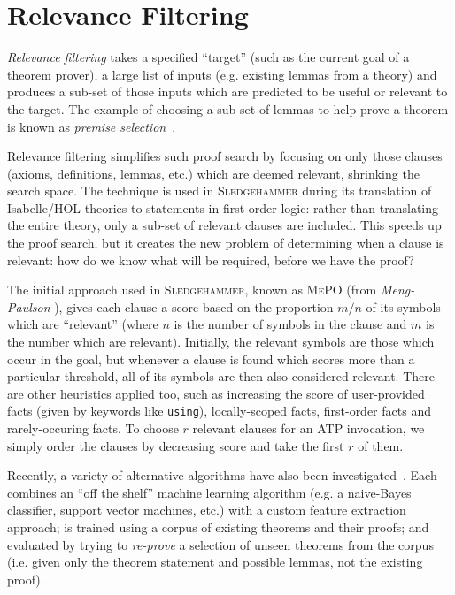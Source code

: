 \section{Relevance Filtering}
\label{sec:relevance}

\emph{Relevance filtering} takes a specified ``target'' (such as the current
goal of a theorem prover), a large list of inputs (e.g. existing lemmas from a
theory) and produces a sub-set of those inputs which are predicted to be useful
or relevant to the target. The example of choosing a sub-set of lemmas to help
prove a theorem is known as \emph{premise
  selection}~\cite{kuhlwein2012overview}.

Relevance filtering simplifies such proof search by focusing on only those
clauses (axioms, definitions, lemmas, etc.) which are deemed relevant, shrinking
the search space. The technique is used in \textsc{Sledgehammer} during its
translation of Isabelle/HOL theories to statements in first order logic: rather
than translating the entire theory, only a sub-set of relevant clauses are
included. This speeds up the proof search, but it creates the new problem of
determining when a clause is relevant: how do we know what will be required,
before we have the proof?

The initial approach used in \textsc{Sledgehammer}, known as \textsc{MePO} (from
\emph{Meng-Paulson} \cite{meng2009lightweight}), gives each clause a score based
on the proportion $m / n$ of its symbols which are ``relevant'' (where $n$ is
the number of symbols in the clause and $m$ is the number which are relevant).
Initially, the relevant symbols are those which occur in the goal, but whenever
a clause is found which scores more than a particular threshold, all of its
symbols are then also considered relevant. There are other heuristics applied
too, such as increasing the score of user-provided facts (given by keywords
like \texttt{using}), locally-scoped facts, first-order facts and
rarely-occuring facts. To choose $r$ relevant clauses for an ATP invocation, we
simply order the clauses by decreasing score and take the first $r$ of them.

Recently, a variety of alternative algorithms have also been
investigated~\cite{kuhlwein2013mash,hoder2011sine,urban2013blistr,gauthier2015premise,alama2014premise,carlson1999snow,kaliszyk2014machinelearner,kaliszyk2015femalecop}.
Each combines an ``off the shelf'' machine learning algorithm (e.g. a
naive-Bayes classifier, support vector machines, etc.) with a custom feature
extraction approach; is trained using a corpus of existing theorems and their
proofs; and evaluated by trying to \emph{re-prove} a selection of unseen
theorems from the corpus (i.e. given only the theorem statement and possible
lemmas, not the existing proof).

